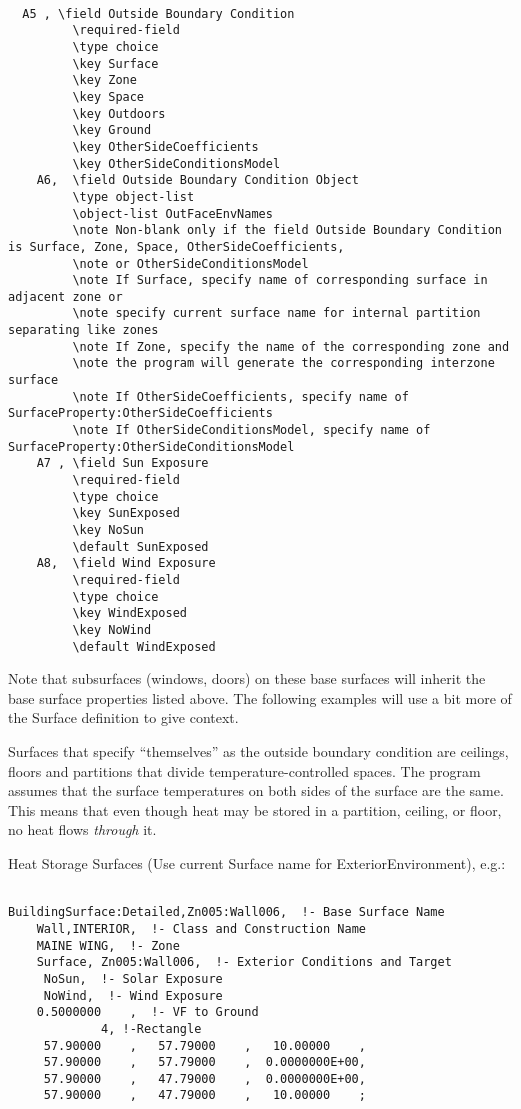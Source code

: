 \begin{lstlisting}

  A5 , \field Outside Boundary Condition
         \required-field
         \type choice
         \key Surface
         \key Zone
         \key Space
         \key Outdoors
         \key Ground
         \key OtherSideCoefficients
         \key OtherSideConditionsModel
    A6,  \field Outside Boundary Condition Object
         \type object-list
         \object-list OutFaceEnvNames
         \note Non-blank only if the field Outside Boundary Condition is Surface, Zone, Space, OtherSideCoefficients,
         \note or OtherSideConditionsModel
         \note If Surface, specify name of corresponding surface in adjacent zone or
         \note specify current surface name for internal partition separating like zones
         \note If Zone, specify the name of the corresponding zone and
         \note the program will generate the corresponding interzone surface
         \note If OtherSideCoefficients, specify name of SurfaceProperty:OtherSideCoefficients
         \note If OtherSideConditionsModel, specify name of SurfaceProperty:OtherSideConditionsModel
    A7 , \field Sun Exposure
         \required-field
         \type choice
         \key SunExposed
         \key NoSun
         \default SunExposed
    A8,  \field Wind Exposure
         \required-field
         \type choice
         \key WindExposed
         \key NoWind
         \default WindExposed
\end{lstlisting}

Note that subsurfaces (windows, doors) on these base surfaces will inherit the base surface properties listed above. The following examples will use a bit more of the Surface definition to give context.

Surfaces that specify ``themselves'' as the outside boundary condition are ceilings, floors and partitions that divide temperature-controlled spaces. The program assumes that the surface temperatures on both sides of the surface are the same. This means that even though heat may be stored in a partition, ceiling, or floor, no heat flows \emph{through} it.

Heat Storage Surfaces (Use current Surface name for ExteriorEnvironment), e.g.:

\begin{lstlisting}

BuildingSurface:Detailed,Zn005:Wall006,  !- Base Surface Name
    Wall,INTERIOR,  !- Class and Construction Name
    MAINE WING,  !- Zone
    Surface, Zn005:Wall006,  !- Exterior Conditions and Target
     NoSun,  !- Solar Exposure
     NoWind,  !- Wind Exposure
    0.5000000    ,  !- VF to Ground
             4, !-Rectangle
     57.90000    ,   57.79000    ,   10.00000    ,
     57.90000    ,   57.79000    ,  0.0000000E+00,
     57.90000    ,   47.79000    ,  0.0000000E+00,
     57.90000    ,   47.79000    ,   10.00000    ;
\end{lstlisting}

